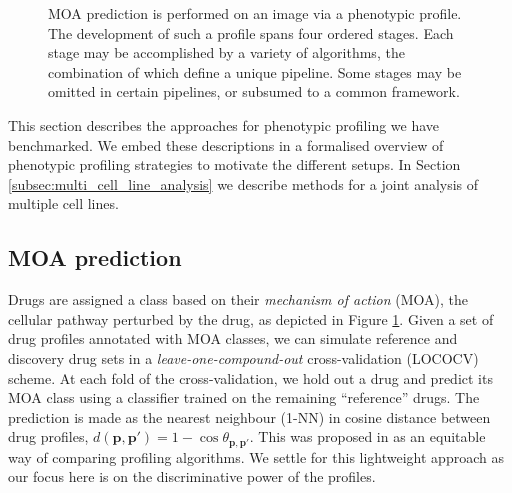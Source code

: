 \begin{figure}
\begin{tikzpicture}[x=0.75pt,y=0.75pt,yscale=-1.5,xscale=1.5]
\end{tikzpicture}

\caption{MOA prediction is performed on an image via a phenotypic profile. The development of such a profile spans four ordered stages. Each stage may be accomplished by a variety of algorithms, the combination of which define a unique pipeline. Some stages may be omitted in certain pipelines, or subsumed to a common framework.}
\label{fig:profiling}
\end{figure}

This section describes the approaches for phenotypic profiling we have benchmarked. We embed these descriptions in a formalised overview of phenotypic profiling strategies to motivate the different setups. In Section \ref{subsec:multi_cell_line_analysis} we describe methods for a joint analysis of multiple cell lines.

\subsection{MOA prediction}
\label{subsec:moa_prediction}

Drugs are assigned a class based on their \emph{mechanism of action} (MOA), the cellular pathway perturbed by the drug, as depicted in Figure \ref{fig:profiling}. Given a set of drug profiles annotated with MOA classes, we can simulate reference and discovery drug sets in a \emph{leave-one-compound-out} cross-validation (LOCOCV) scheme. At each fold of the cross-validation, we hold out a drug and predict its MOA class using a classifier trained on the remaining ``reference'' drugs. The prediction is made as the nearest neighbour (1-NN) in cosine distance between drug profiles, $d(\mathbf{p}, \mathbf{p}') = 1 - \cos\theta_{\mathbf{p}, \mathbf{p}'}$. This was proposed in \cite{ljosa2013comparison} as an equitable way of comparing profiling algorithms. We settle for this lightweight approach as our focus here is on the discriminative power of the profiles.

%
%


